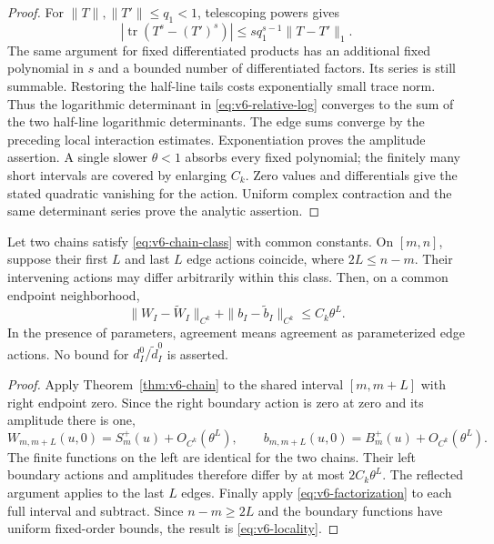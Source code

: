 \begin{proof}
For $\|T\|,\|T'\|\le q_1<1$, telescoping powers gives
\[
 |\operatorname{tr}(T^s-(T')^s)|
 \le s q_1^{s-1}\|T-T'\|_1.
\]
The same argument for fixed differentiated products has an additional
fixed polynomial in $s$ and a bounded number of differentiated factors.
Its series is still summable. Restoring the half-line tails costs
exponentially small trace norm. Thus the logarithmic determinant in
\eqref{eq:v6-relative-log} converges to the sum of the two half-line
logarithmic determinants. The edge sums converge by the preceding
local interaction estimates. Exponentiation proves the amplitude
assertion. A single slower $\theta<1$ absorbs every fixed polynomial;
the finitely many short intervals are covered by enlarging $C_k$.
Zero values and differentials give the stated quadratic vanishing for
the action. Uniform complex contraction and the same determinant
series prove the analytic assertion.
\end{proof}

\begin{theorem}
\label{thm:v6-relative-locality}
Let two chains satisfy \eqref{eq:v6-chain-class} with common constants.
On $[m,n]$, suppose their first $L$ and last $L$ edge actions coincide,
where $2L\le n-m$. Their intervening actions may differ arbitrarily
within this class. Then, on a common endpoint neighborhood,
\begin{equation}\label{eq:v6-locality}
 \|W_I-\widetilde W_I\|_{C^k}
 +\|b_I-\widetilde b_I\|_{C^k}\le C_k\theta^L.
\end{equation}
In the presence of parameters, agreement means agreement as parameterized
edge actions. No bound for $d_I^0/\widetilde d_I^0$ is asserted.
\end{theorem}
\begin{proof}
Apply Theorem~\ref{thm:v6-chain} to the shared interval $[m,m+L]$
with right endpoint zero. Since the right boundary action is zero at
zero and its amplitude there is one,
\[
 W_{m,m+L}(u,0)=S_m^+(u)+O_{C^k}(\theta^L),\qquad
 b_{m,m+L}(u,0)=B_m^+(u)+O_{C^k}(\theta^L).
\]
The finite functions on the left are identical for the two chains.
Their left boundary actions and amplitudes therefore differ by at most
$2C_k\theta^L$. The reflected argument applies to the last $L$ edges.
Finally apply \eqref{eq:v6-factorization} to each full interval and
subtract. Since $n-m\ge2L$ and the boundary functions have uniform
fixed-order bounds, the result is \eqref{eq:v6-locality}.
\end{proof}

